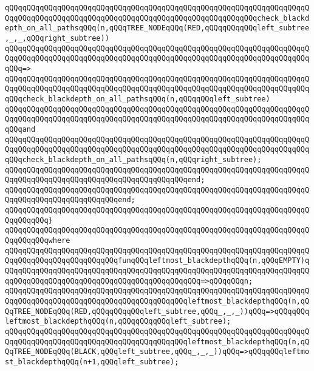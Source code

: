 \newline
\newline
\verb|qQQqqQQqqQQqqQQqqQQqqQQqqQQqqQQqqQQqqQQqqQQqqQQqqQQqqQQqqQQqqQQqqQQqqQQqqQQqqQQqqQQqqQQqqQQqqQQqqQQqqQQqqQQqqQQqqQQqqQQqqQQqqQQqcheck_blackdepth_on_all_pathsqQQq(n,qQQqTREE_NODEqQQq(RED,qQQqqQQqqQQqleft_subtree,_,_,qQQqright_subtree))|\newline
\verb|qQQqqQQqqQQqqQQqqQQqqQQqqQQqqQQqqQQqqQQqqQQqqQQqqQQqqQQqqQQqqQQqqQQqqQQqqQQqqQQqqQQqqQQqqQQqqQQqqQQqqQQqqQQqqQQqqQQqqQQqqQQqqQQqqQQqqQQqqQQqqQQq=>|\newline
\verb|qQQqqQQqqQQqqQQqqQQqqQQqqQQqqQQqqQQqqQQqqQQqqQQqqQQqqQQqqQQqqQQqqQQqqQQqqQQqqQQqqQQqqQQqqQQqqQQqqQQqqQQqqQQqqQQqqQQqqQQqqQQqqQQqqQQqqQQqqQQqqQQqcheck_blackdepth_on_all_pathsqQQq(n,qQQqqQQqleft_subtree)|\newline
\verb|qQQqqQQqqQQqqQQqqQQqqQQqqQQqqQQqqQQqqQQqqQQqqQQqqQQqqQQqqQQqqQQqqQQqqQQqqQQqqQQqqQQqqQQqqQQqqQQqqQQqqQQqqQQqqQQqqQQqqQQqqQQqqQQqqQQqqQQqqQQqqQQqand|\newline
\verb|qQQqqQQqqQQqqQQqqQQqqQQqqQQqqQQqqQQqqQQqqQQqqQQqqQQqqQQqqQQqqQQqqQQqqQQqqQQqqQQqqQQqqQQqqQQqqQQqqQQqqQQqqQQqqQQqqQQqqQQqqQQqqQQqqQQqqQQqqQQqqQQqcheck_blackdepth_on_all_pathsqQQq(n,qQQqright_subtree);|\newline
\verb|qQQqqQQqqQQqqQQqqQQqqQQqqQQqqQQqqQQqqQQqqQQqqQQqqQQqqQQqqQQqqQQqqQQqqQQqqQQqqQQqqQQqqQQqqQQqqQQqqQQqqQQqqQQqqQQqend;|\newline
\verb|qQQqqQQqqQQqqQQqqQQqqQQqqQQqqQQqqQQqqQQqqQQqqQQqqQQqqQQqqQQqqQQqqQQqqQQqqQQqqQQqqQQqqQQqqQQqqQQqend;|\newline
\verb|qQQqqQQqqQQqqQQqqQQqqQQqqQQqqQQqqQQqqQQqqQQqqQQqqQQqqQQqqQQqqQQqqQQqqQQqqQQqqQQq}|\newline
\verb|qQQqqQQqqQQqqQQqqQQqqQQqqQQqqQQqqQQqqQQqqQQqqQQqqQQqqQQqqQQqqQQqqQQqqQQqqQQqqQQqwhere|\newline
\verb|qQQqqQQqqQQqqQQqqQQqqQQqqQQqqQQqqQQqqQQqqQQqqQQqqQQqqQQqqQQqqQQqqQQqqQQqqQQqqQQqqQQqqQQqqQQqqQQqfunqQQqleftmost_blackdepthqQQq(n,qQQqEMPTY)qQQqqQQqqQQqqQQqqQQqqQQqqQQqqQQqqQQqqQQqqQQqqQQqqQQqqQQqqQQqqQQqqQQqqQQqqQQqqQQqqQQqqQQqqQQqqQQqqQQqqQQqqQQqqQQqqQQq=>qQQqqQQqn;|\newline
\verb|qQQqqQQqqQQqqQQqqQQqqQQqqQQqqQQqqQQqqQQqqQQqqQQqqQQqqQQqqQQqqQQqqQQqqQQqqQQqqQQqqQQqqQQqqQQqqQQqqQQqqQQqqQQqqQQqleftmost_blackdepthqQQq(n,qQQqTREE_NODEqQQq(RED,qQQqqQQqqQQqleft_subtree,qQQq_,_,_))qQQq=>qQQqqQQqleftmost_blackdepthqQQq(n,qQQqqQQqqQQqleft_subtree);|\newline
\verb|qQQqqQQqqQQqqQQqqQQqqQQqqQQqqQQqqQQqqQQqqQQqqQQqqQQqqQQqqQQqqQQqqQQqqQQqqQQqqQQqqQQqqQQqqQQqqQQqqQQqqQQqqQQqqQQqleftmost_blackdepthqQQq(n,qQQqTREE_NODEqQQq(BLACK,qQQqleft_subtree,qQQq_,_,_))qQQq=>qQQqqQQqleftmost_blackdepthqQQq(n+1,qQQqleft_subtree);|\newline
